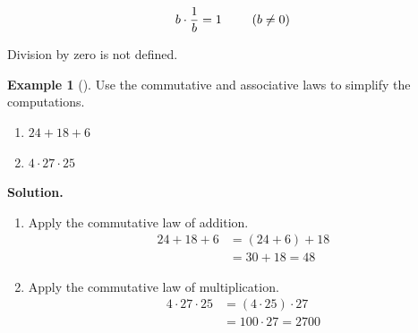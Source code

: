 \documentclass[10pt,]{book}
\theoremstyle{plain}
\theoremstyle{definition}
\theoremstyle{definition}
\newtheorem{example}[theorem]{Example}
\theoremstyle{definition}
\numberwithin{equation}{part}
\newcommand{\amp}{&}
\begin{document}
\begin{equation*}
b\cdot\frac{1}{b}=1 \hphantom{blank} (b\ne 0)
\end{equation*}
%
\par
Division by zero is not defined.%
\begin{example}[]\label{example-91}
Use the commutative and associative laws to simplify the computations. \leavevmode%
\begin{enumerate}[label=*\alph**]
\item\hypertarget{li-393}{}\(24 + 18 + 6\)%
\item\hypertarget{li-394}{}\(4 \cdot 27\cdot 25\)%
\end{enumerate}
%
\par\medskip\noindent%
\textbf{Solution.}\quad \leavevmode%
\begin{enumerate}[label=*\alph**]
\item\hypertarget{li-395}{}Apply the commutative law of addition.%
\begin{align*}
24 + 18 + 6 \amp = (24 + 6) + 18
\\
\amp = 30 + 18 = 48
\end{align*}
%
\item\hypertarget{li-396}{}Apply the commutative law of multiplication.%
\begin{align*}
4 \cdot 27\cdot 25 \amp = (4\cdot 25)\cdot 27
\\
\amp = 100 \cdot 27 = 2700
\end{align*}
%
\end{enumerate}
%
\end{example}
\typeout{************************************************}
\typeout{************************************************}
\end{document}
